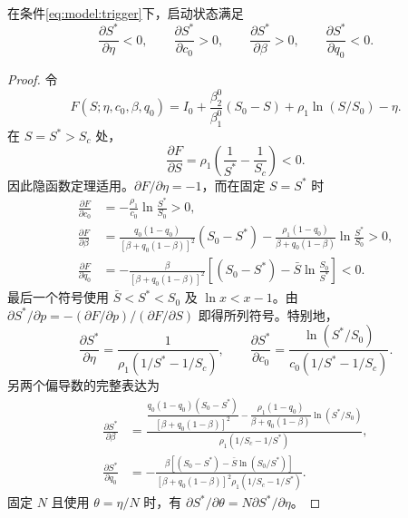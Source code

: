 \begin{lemma}
\label{lem:s1:Sstar-sensitivity}
在条件\eqref{eq:model:trigger}下，启动状态满足
\begin{equation}
\frac{\partial S^*}{\partial\eta}<0,\qquad
\frac{\partial S^*}{\partial c_0}>0,\qquad
\frac{\partial S^*}{\partial\beta}>0,\qquad
\frac{\partial S^*}{\partial q_0}<0.
\label{eq:s1:Sstar-signs}
\end{equation}
\end{lemma}
\begin{proof}
令
\[
F(S;\eta,c_0,\beta,q_0)
=I_0+\frac{\beta_2^0}{\beta_1^0}(S_0-S)+\rho_1\ln(S/S_0)-\eta.
\]
在 $S=S^*>S_c$ 处，
\[
\frac{\partial F}{\partial S}=\rho_1\left(\frac1{S^*}-\frac1{S_c}\right)<0.
\]
因此隐函数定理适用。$\partial F/\partial\eta=-1$，而在固定 $S=S^*$ 时
\begin{align*}
\frac{\partial F}{\partial c_0}
&=-\frac{\rho_1}{c_0}\ln\frac{S^*}{S_0}>0,\\
\frac{\partial F}{\partial\beta}
&=\frac{q_0(1-q_0)}{[\beta+q_0(1-\beta)]^2}(S_0-S^*)
-\frac{\rho_1(1-q_0)}{\beta+q_0(1-\beta)}\ln\frac{S^*}{S_0}>0,\\
\frac{\partial F}{\partial q_0}
&=-\frac{\beta}{[\beta+q_0(1-\beta)]^2}\left[(S_0-S^*)-\bar S\ln\frac{S_0}{S^*}\right]<0.
\end{align*}
最后一个符号使用 $\bar S<S^*<S_0$ 及 $\ln x<x-1$。由
$\partial S^*/\partial p=-(\partial F/\partial p)/(\partial F/\partial S)$ 即得所列符号。特别地，
\begin{equation}
\frac{\partial S^*}{\partial\eta}
=\frac1{\rho_1(1/S^*-1/S_c)},\qquad
\frac{\partial S^*}{\partial c_0}
=\frac{\ln(S^*/S_0)}{c_0(1/S^*-1/S_c)}.
\label{eq:s1:Sstar-eta-sign}
\end{equation}
另两个偏导数的完整表达为
\begin{align}
\frac{\partial S^*}{\partial\beta}
&=\frac{\dfrac{q_0(1-q_0)(S_0-S^*)}{[\beta+q_0(1-\beta)]^2}
-\dfrac{\rho_1(1-q_0)}{\beta+q_0(1-\beta)}\ln(S^*/S_0)}
{\rho_1(1/S_c-1/S^*)},\label{eq:s1:Sstar-beta-sign}\\
\frac{\partial S^*}{\partial q_0}
&=-\frac{\beta[(S_0-S^*)-\bar S\ln(S_0/S^*)]}
{[\beta+q_0(1-\beta)]^2\rho_1(1/S_c-1/S^*)}.
\label{eq:s1:Sstar-q0-sign}
\end{align}
固定 $N$ 且使用 $\theta=\eta/N$ 时，有 $\partial S^*/\partial\theta=N\partial S^*/\partial\eta$。
\end{proof}

